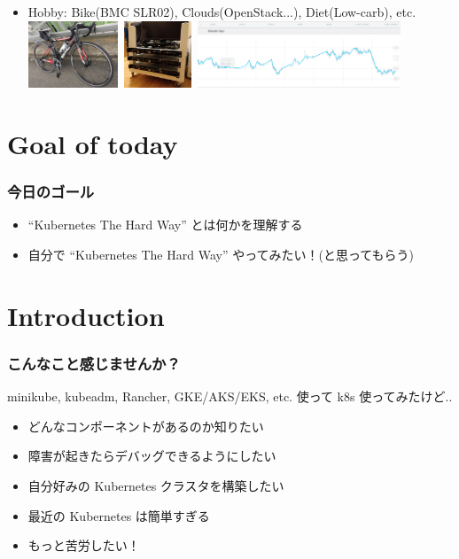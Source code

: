 \documentclass[aspectratio=169,11pt,hyperref={colorlinks=true}]{beamer}
\begin{document}
\begin{frame}
\begin{itemize}
    \item Hobby: Bike(BMC SLR02), Clouds(OpenStack...), Diet(Low-carb), etc.
    \includegraphics[height=20mm]{images/my-bike.jpg}~\includegraphics[height=20mm]{images/server_front.jpg}~\includegraphics[height=20mm]{images/my-weight.png}
  \end{itemize}
\end{frame}

\section{Goal of today}
\begin{frame}
  \frametitle{今日のゴール}
  \begin{itemize}
    \item ``Kubernetes The Hard Way'' とは何かを理解する
    \item 自分で ``Kubernetes The Hard Way'' やってみたい！(と思ってもらう)
  \end{itemize}
\end{frame}

\section{Introduction}
\begin{frame}
  \frametitle{こんなこと感じませんか？}
  minikube, kubeadm, Rancher, GKE/AKS/EKS, etc. 使って k8s 使ってみたけど..
  \begin{itemize}
    \item どんなコンポーネントがあるのか知りたい
    \item 障害が起きたらデバッグできるようにしたい
    \item 自分好みの Kubernetes クラスタを構築したい
    \item 最近の Kubernetes は簡単すぎる
    \item もっと苦労したい！
  \end{itemize}
\end{frame}
\end{document}
